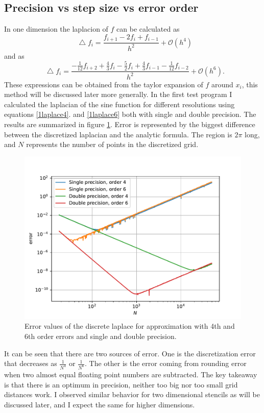 \documentclass[pdftex,12pt,a4paper]{article}
\newcommand*\Laplace{\mathop{}\!\mathbin\bigtriangleup}
\begin{document}
	\subsection{Precision vs step size vs error order}
		In one dimension the laplacion of $f$ can be calculated as
		\begin{equation}
			\Laplace f_i = \frac{f_{i+1} - 2f_i + f_{i-1}}{h^2} + \mathcal{O}(h^4)
			\label{1laplace4}
		\end{equation}
		and as
		\begin{equation}
			\Laplace f_i = \frac{-\frac{1}{12}f_{i+2} + \frac{4}{3}f_i - \frac{5}{2}f_i + \frac{4}{3}f_{i-1} - \frac{1}{12}f_{i-2}}{h^2} + \mathcal{O}(h^6).
			\label{1laplace6}
		\end{equation}
		These expressions can be obtained from the taylor expansion of $f$ around $x_i$, this method will be discussed later more generally. In the first test program I calculated the laplacian of the sine function for different resolutions using equations \ref{1laplace4}. and \ref{1laplace6} both with single and double precision. The results are summarized in figure \ref{1dpdf}. Error is represented by the biggest difference between the discretized laplacian and the analytic formula. The region is $2\pi$ long, and $N$ represents the number of points in the discretized grid.
		\begin{figure}[H]
			\centering
			\includegraphics[scale=1]{./figs/1d.pdf}
			\caption{Error values of the discrete laplace for approximation with 4th and 6th order errors and single and double precision. }
			\label{1dpdf}
		\end{figure}
		It can be seen that there are two sources of error. One is the discretization error that decreases as $\frac{1}{N^4}$ or $\frac{1}{N^6}$. The other is the error coming from rounding error when two almost equal floating point numbers are subtracted. The key takeaway is that there is an optimum in precision, neither too big nor too small grid distances work. I observed similar behavior for two dimensional stencils as will be discussed later, and I expect the same for higher dimensions.
\end{document}
